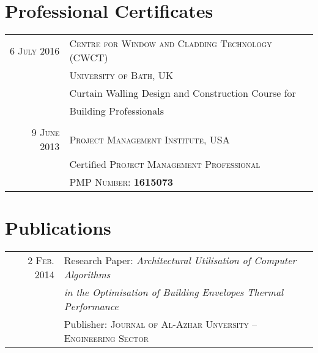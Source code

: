 \documentclass[a4paper,11pt]{article} %
\begin{document}

\vspace{0.5cm}
\section{Professional Certificates}

\begin{tabular}{r|l}
\textsc{6 July} 2016 & \textsc{Centre for Window and Cladding Technology (CWCT)}\\
& \textsc{University of Bath, UK}\\
& Curtain Walling Design and Construction Course for \\
& Building Professionals \\
\multicolumn{2}{c}{} \\

\textsc{9 June} 2013 & \textsc{Project Management Institute}, USA\\
& Certified \textsc{Project Management Professional}\\
& \textsc{PMP Number:} \textbf{1615073}\\

\end{tabular}



\section{Publications}

\begin{tabular}{r|l}
\hspace{9.5mm}\textsc{ 2 Feb.} 2014 & Research Paper: \emph{Architectural Utilisation of Computer Algorithms}\\
&\emph{ in the Optimisation of Building Envelopes Thermal Performance}\\
& Publisher: \textsc{Journal of Al-Azhar Unversity -- Engineering Sector}\\

\end{tabular}
\end{document}
